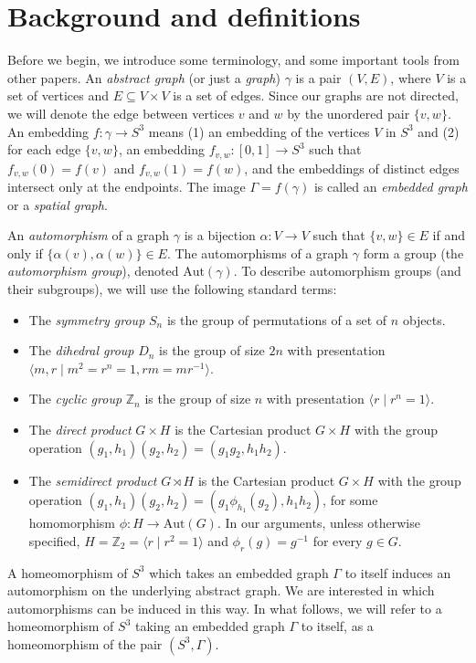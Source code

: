 \documentclass[11]{amsart}
\def\Z{\mathbb{Z}}
\newcommand{\semi}{{\rtimes}}
\def\Aut{{\mathrm{Aut}}}
\theoremstyle{definition}
\theoremstyle{remark}
\begin{document}
\section{Background and definitions}

Before we begin, we introduce some terminology, and some important tools from other papers.  An {\em abstract graph} (or just a {\em graph}) $\gamma$ is a pair $(V, E)$, where $V$ is a set of vertices and $E \subseteq V \times V$ is a set of edges. Since our graphs are not directed, we will denote the edge between vertices $v$ and $w$ by the unordered pair $\{v,w\}$. An embedding $f: \gamma \rightarrow S^3$ means (1) an embedding of the vertices $V$ in $S^3$ and (2) for each edge $\{v, w\}$, an embedding $f_{v,w}: [0,1] \rightarrow S^3$ such that $f_{v,w}(0) = f(v)$ and $f_{v,w}(1) = f(w)$, and the embeddings of distinct edges intersect only at the endpoints. The image $\Gamma = f(\gamma)$ is called an {\em embedded graph} or a {\em spatial graph}.

An {\em automorphism} of a graph $\gamma$ is a bijection $\alpha: V \rightarrow V$ such that $\{v, w\} \in E$ if and only if $\{\alpha(v), \alpha(w)\} \in E$. The automorphisms of a graph $\gamma$ form a group (the {\em automorphism group}), denoted $\Aut(\gamma)$. To describe automorphism groups (and their subgroups), we will use the following standard terms:
\begin{itemize}
\item The {\em symmetry group} $S_n$ is the group of permutations of a set of $n$ objects.
\item The {\em dihedral group} $D_n$ is the group of size $2n$ with presentation $\langle m, r \mid m^2 = r^n = 1, rm = mr^{-1}\rangle$.
\item The {\em cyclic group} $\Z_n$ is the group of size $n$ with presentation $\langle r \mid r^n = 1\rangle$.
\item The {\em direct product} $G \times H$ is the Cartesian product $G \times H$ with the group operation $(g_1, h_1)(g_2, h_2) = (g_1g_2, h_1h_2)$.
\item The {\em semidirect product} $G \semi H$ is the Cartesian product $G\times H$ with the group operation $(g_1, h_1)(g_2, h_2) = (g_1\phi_{h_1}(g_2), h_1h_2)$, for some homomorphism $\phi: H \rightarrow \Aut(G)$. In our arguments, unless otherwise specified, $H = \Z_2 = \langle r \mid r^2 = 1\rangle$ and $\phi_r(g) = g^{-1}$ for every $g \in G$.
\end{itemize}

A homeomorphism of $S^3$ which takes an embedded graph $\Gamma$ to itself induces an automorphism on the underlying abstract graph. We are interested in which automorphisms can be induced in this way. In what follows, we will refer to a homeomorphism of $S^3$ taking an embedded graph $\Gamma$ to itself, as a homeomorphism of the pair $(S^3,\Gamma)$.
\end{document}
